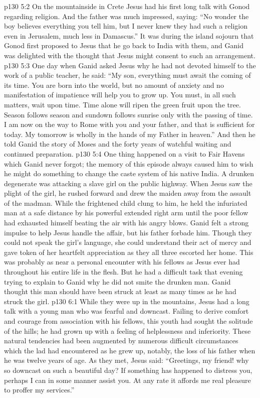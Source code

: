 \vs p130 5:2 On the mountainside in Crete Jesus had his first long talk with Gonod regarding religion. And the father was much impressed, saying: “No wonder the boy believes everything you tell him, but I never knew they had such a religion even in Jerusalem, much less in Damascus.” It was during the island sojourn that Gonod first proposed to Jesus that he go back to India with them, and Ganid was delighted with the thought that Jesus might consent to such an arrangement.
\vs p130 5:3 One day when Ganid asked Jesus why he had not devoted himself to the work of a public teacher, he said: \textcolor{ubdarkred}{“My son, everything must await the coming of its time. You are born into the world, but no amount of anxiety and no manifestation of impatience will help you to grow up. You must, in all such matters, wait upon time. Time alone will ripen the green fruit upon the tree. Season follows season and sundown follows sunrise only with the passing of time. I am now on the way to Rome with you and your father, and that is sufficient for today. My tomorrow is wholly in the hands of my Father in heaven.”} And then he told Ganid the story of Moses and the forty years of watchful waiting and continued preparation.
\vs p130 5:4 One thing happened on a visit to Fair Havens which Ganid never forgot; the memory of this episode always caused him to wish he might do something to change the caste system of his native India. A drunken degenerate was attacking a slave girl on the public highway. When Jesus saw the plight of the girl, he rushed forward and drew the maiden away from the assault of the madman. While the frightened child clung to him, he held the infuriated man at a safe distance by his powerful extended right arm until the poor fellow had exhausted himself beating the air with his angry blows. Ganid felt a strong impulse to help Jesus handle the affair, but his father forbade him. Though they could not speak the girl’s language, she could understand their act of mercy and gave token of her heartfelt appreciation as they all three escorted her home. This was probably as near a personal encounter with his fellows as Jesus ever had throughout his entire life in the flesh. But he had a difficult task that evening trying to explain to Ganid why he did not smite the drunken man. Ganid thought this man should have been struck at least as many times as he had struck the girl.
\vs p130 6:1 While they were up in the mountains, Jesus had a long talk with a young man who was fearful and downcast. Failing to derive comfort and courage from association with his fellows, this youth had sought the solitude of the hills; he had grown up with a feeling of helplessness and inferiority. These natural tendencies had been augmented by numerous difficult circumstances which the lad had encountered as he grew up, notably, the loss of his father when he was twelve years of age. As they met, Jesus said: \textcolor{ubdarkred}{“Greetings, my friend! why so downcast on such a beautiful day? If something has happened to distress you, perhaps I can in some manner assist you. At any rate it affords me real pleasure to proffer my services.”}
